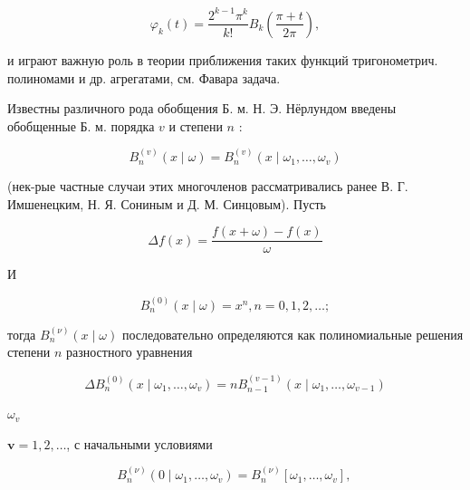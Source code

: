 \documentclass[10pt]{article}
\begin{document}
\[

\varphi_{k}(t)=\frac{2^{k-1} \pi^{k}}{k !} B_{k}\left(\frac{\pi+t}{2 \pi}\right),

\]



и играют важную роль в теории приближения таких функций тригонометрич. полиномами и др. агрегатами, см. Фавара задача.



Известны различного рода обобщения Б. м. Н. Э. Нёрлундом введены обобщенные Б. м. порядка $v$ и степени $n$ :



\[

B_{n}^{(v)}(x \mid \omega)=B_{n}^{(v)}\left(x \mid \omega_{1}, \ldots, \omega_{v}\right)

\]



(нек-рые частные случаи этих многочленов рассматривались ранее В. Г. Имшенецким, Н. Я. Сониным и Д. М. Синцовым). Пусть



\[

\Delta f(x)=\frac{f(x+\omega)-f(x)}{\omega}

\]



$\mathbf{И}$



\[

B_{n}^{(0)}(x \mid \omega)=x^{n}, n=0,1,2, \ldots ;

\]



тогда $B_{n}^{(\nu)}(x \mid \omega)$ последовательно определяются как полиномиальные решения степени $n$ разностного уравнения



\[

\Delta B_{n}^{(0)}\left(x \mid \omega_{1}, \ldots, \omega_{v}\right)=n B_{n-1}^{(v-1)}\left(x \mid \omega_{1}, \ldots, \omega_{v-1}\right)

\]



$\omega_{v}$



$\boldsymbol{v}=1,2, \ldots$, с начальными условиями



\[

B_{n}^{(\nu)}\left(0 \mid \omega_{1}, \ldots, \omega_{v}\right)=B_{n}^{(\nu)}\left[\omega_{1}, \ldots, \omega_{v}\right] \text {, }

\]
\end{document}
